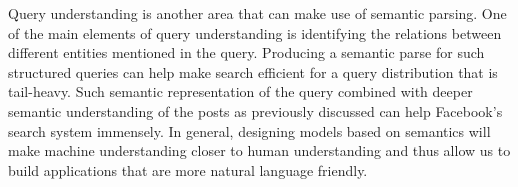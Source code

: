 \documentclass[11pt,a4paper]{article}
\begin{document}
Query understanding is another area that can make use of semantic parsing. One of the main elements of query understanding is identifying the relations between different entities mentioned in the query. Producing a semantic parse for such structured queries can help make search efficient for a query distribution that is tail-heavy. Such semantic representation of the query combined with deeper semantic understanding of the posts as previously discussed can help Facebook's search system immensely. In general, designing models based on semantics will make machine understanding closer to human understanding and thus allow us to build applications that are more natural language friendly. 



\end{document}
